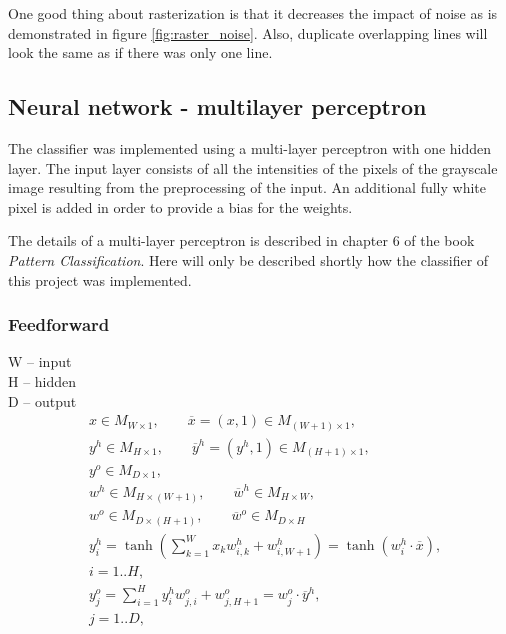 \documentclass[report.tex]{subfile}
\begin{document}
One good thing about rasterization is that it decreases the impact of noise as
is demonstrated in figure \ref{fig:raster_noise}. Also, duplicate overlapping
lines will look the same as if there was only one line.

\subsection{Neural network - multilayer perceptron}
\begin{figure}
    \centering
    
    \caption{}
    \label{fig:mlp}
\end{figure}
The classifier was implemented using a multi-layer perceptron with one hidden
layer. The input layer consists of all the intensities of the pixels of the
grayscale image resulting from the preprocessing of the input. An additional
fully white pixel is added in order to provide a bias for the weights.

The details of a multi-layer perceptron is described in chapter 6 of the book
\emph{Pattern Classification}\cite{hart-pattern}. Here will only be described
shortly how the classifier of this project was implemented.

\subsubsection{Feedforward}
W -- input \\
H -- hidden \\
D -- output \\

\begin{align*}
    &x \in M_{W \times 1}, \qquad
    \overline x = \left( x, 1 \right) \in M_{(W+1) \times 1}, \\
    &y^h \in M_{H \times 1}, \qquad
    \overline y^h = \left( y^h, 1 \right) \in M_{(H+1) \times 1}, \\
    &y^o \in M_{D \times 1}, \\
    &w^h \in M_{H \times (W + 1)}, \qquad
    \overline w^h \in M_{H \times W}, \\
    &w^o \in M_{D \times (H + 1)}, \qquad
    \overline w^o \in M_{D \times H} \\
    &y^h_i = \tanh \left( \sum_{k=1}^{W} x_k w^h_{i,k} + w^h_{i,W+1} \right)
           = \tanh \left( w^h_i \cdot \overline x \right), \\
    &i = 1..H, \\
    &y^o_j = \sum_{i=1}^{H} y^h_i w^o_{j,i} + w^o_{j,H+1}
           = w^o_j \cdot \overline y^h, \\
    &j = 1..D, \\
\end{align*}
\end{document}
